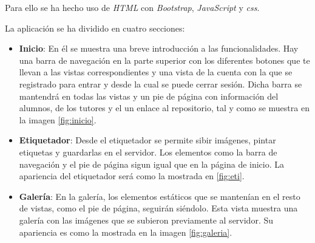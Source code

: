  Para ello se ha hecho uso de \textit{HTML} con \textit{Bootstrap}, \textit{JavaScript} y \textit{css}.
 
 La aplicación se ha dividido en cuatro secciones:
 
 \begin{itemize}
 	\item \textbf{Inicio}: En él se muestra una breve introducción a las funcionalidades. Hay una barra de navegación en la parte superior con los diferentes botones que te llevan a las vistas correspondientes y una vista de la cuenta con la que se registrado para entrar y desde la cual se puede cerrar sesión.
 	 Dicha barra se mantendrá en todas las vistas y un pie de página con información del alumnos, de los tutores y el un enlace al repositorio, tal y como se muestra en la imagen \ref{fig:inicio}.
 	
 	\item \textbf{Etiquetador}: Desde el etiquetador se permite sibir imágenes, pintar etiquetas y guardarlas en el servidor.
 	Los elementos como la barra de navegación y el pie de página sigun igual que en la página de inicio. La apariencia del etiquetador será como la mostrada en \ref{fig:eti}.
 	\item \textbf{Galería}: En la galería, los elementos estáticos que se mantenían en el resto de vistas, como el pie de página, seguirán siéndolo.
 	Esta vista muestra una galería con las imágenes que se subieron previamente al servidor. Su apariencia es como la mostrada en la imagen \ref{fig:galeria}.
 	
 \end{itemize}
 


